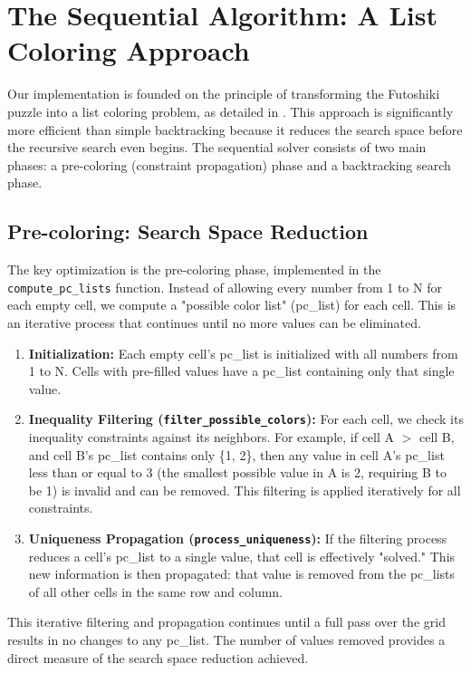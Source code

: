 \section{The Sequential Algorithm: A List Coloring Approach}
Our implementation is founded on the principle of transforming the Futoshiki puzzle into a list coloring problem, as detailed in \cite{Sen2024Futoshiki}. This approach is significantly more efficient than simple backtracking because it reduces the search space before the recursive search even begins. The sequential solver consists of two main phases: a pre-coloring (constraint propagation) phase and a backtracking search phase.

\subsection{Pre-coloring: Search Space Reduction}
The key optimization is the pre-coloring phase, implemented in the \texttt{compute\_pc\_lists} function. Instead of allowing every number from 1 to N for each empty cell, we compute a "possible color list" (pc\_list) for each cell. This is an iterative process that continues until no more values can be eliminated.

\begin{enumerate}
    \item \textbf{Initialization:} Each empty cell's pc\_list is initialized with all numbers from 1 to N. Cells with pre-filled values have a pc\_list containing only that single value.
    
    \item \textbf{Inequality Filtering (\texttt{filter\_possible\_colors}):} For each cell, we check its inequality constraints against its neighbors. For example, if cell A $>$ cell B, and cell B's pc\_list contains only \{1, 2\}, then any value in cell A's pc\_list less than or equal to 3 (the smallest possible value in A is 2, requiring B to be 1) is invalid and can be removed. This filtering is applied iteratively for all constraints.
    
    \item \textbf{Uniqueness Propagation (\texttt{process\_uniqueness}):} If the filtering process reduces a cell's pc\_list to a single value, that cell is effectively "solved." This new information is then propagated: that value is removed from the pc\_lists of all other cells in the same row and column.
\end{enumerate}

This iterative filtering and propagation continues until a full pass over the grid results in no changes to any pc\_list. The number of values removed provides a direct measure of the search space reduction achieved.


